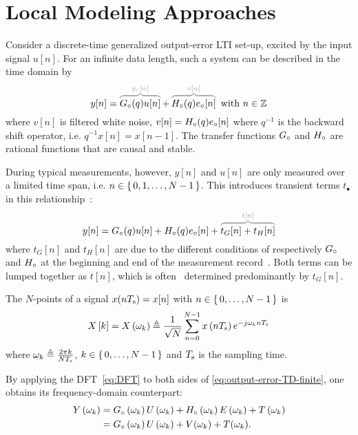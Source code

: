 \section{Local Modeling Approaches}
\label{sec:theory}

Consider a discrete-time generalized output-error \gls{LTI} set-up, excited by the input signal $u[n]$.
For an infinite data length, such a system can be described in the time domain by
\begin{equation}
  y[n] = \ezbrace{\true{G}(q) u[n]}{\true{y}[n]} + \ezbrace{\true{H}(q) \true{e}[n]}{v[n]} \text{ with } n \in \IntegerNumbers
  \label{eq:output-error-TD-infinite}
\end{equation}
where $v[n]$ is filtered white noise, $v[n] = {H}_{\circ}(q) {e}_{\circ}[n]$ where $q^{-1}$ is the backward shift operator, i.e. $q^ {-1}x[n] = x[n-1]$.
The transfer functions ${G}_{\circ}$ and ${H}_{\circ}$ are rational functions that are causal and stable.

During typical measurements, however, $y[n]$ and $u[n]$ are only measured over a limited time span, i.e. $n \in \set{0,1,\ldots,N-1}$.
This introduces transient terms $t_{\bullet}$ in this relationship~\citep{Pintelon1997ARB}:
\begin{equation}
y[n] = \true{G}(q) u[n] + \true{H}(q) \true{e}[n] + \ezbrace{t_G[n] + t_H[n]}{t[n]}
\label{eq:output-error-TD-finite}
\end{equation}
where $t_G[n]$ and $t_H[n]$ are due to the different conditions of respectively ${G}_{\circ}$ and ${H}_{\circ}$ at the beginning and end of the measurement record~\citep{Pintelon1997ARB}.
Both terms can be lumped together as $t[n]$, which is often~\citep{Pintelon2010LPM1} determined predominantly by $t_G[n]$.

\begin{definition}\label{def:DFT}
The $N$-points  of a signal $x(nT_{\mathrm{s}}) = x[n]$ with $n \in \set{0,\ldots,N-1}$ is
\begin{equation}
  X \left[ k \right] =
  X \left( \omega_k \right)
  \triangleq
  \frac{1}{\sqrt{N}}\sum_{n=0}^{N-1} x \left( n T_{\mathrm{s}} \right)  e^{- j \omega_k n T_{\mathrm{s}} }
  \label{eq:DFT}
\end{equation}
where $\omega_k \triangleq \tfrac{2 \pi k }{N T_{\mathrm{s}}}$, $k \in \set{0,\ldots,N-1}$ and $T_{\mathrm{s}}$ is the sampling time.
\end{definition}

By applying the \gls{DFT}~\eqref{eq:DFT} to both sides of \eqref{eq:output-error-TD-finite}, one obtains its frequency-domain counterpart:
\begin{align}
    Y \left( \omega_k \right) 
    & = {G}_{\circ} \left( \omega_k \right) U \left( \omega_k \right) 
      + {H}_{\circ} \left( \omega_k \right) E \left( \omega_k \right)
      + T \left( \omega_k \right)\\
      &= {G}_{\circ} \left( \omega_k \right) U \left( \omega_k \right)  + V(\omega_k) + T(\omega_k)
      \text{.}
  \label{eq:output-error-FD}
\end{align}

